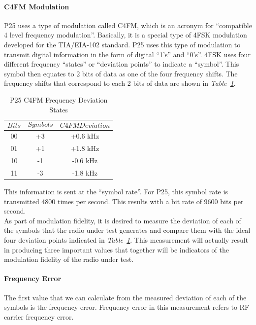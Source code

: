 \paragraph*{C4FM Modulation}  
\- \indent
	P25 uses a type of modulation called C4FM, which is an acronym for “compatible 4 level frequency modulation”\cite{fidelity}. Basically, it is a special type of 4FSK modulation developed for the TIA/EIA-102 standard. P25 uses this type of modulation to transmit digital information in the form of digital “1’s” and “0’s”. 4FSK uses four different frequency “states” or “deviation points” to indicate a “symbol”. This symbol then equates to 2 bits of data as one of the four frequency shifts. The frequency shifts that correspond to each 2 bits of data are shown in \textit{Table~\ref{tab:modfide}}.
	
\begin{table}[H]
  \centering
 	\caption{P25 C4FM Frequency Deviation States}
    \begin{tabular}{c|c|c}
       $$Bits$$ & $$Symbols$$ & $$C4FM Deviation$$ \\ \hline
       00 & +3 & +0.6 kHz  \\ \hline
       01 & +1 & +1.8 kHz  \\ \hline
       10 & -1 & -0.6 kHz  \\ \hline
       11 & -3 & -1.8 kHz  
      
  \end{tabular}
  
  \label{tab:modfide}
\end{table}

	This information is sent at the “symbol rate”. For P25, this symbol rate is transmitted 4800 times per second. This results  with a bit rate of 9600 bits per second. \\
		
	As part of modulation fidelity, it is desired to measure the deviation of each of the symbols that the radio under test generates and compare them with the ideal four deviation points indicated in \textit{Table~\ref{tab:modfide}}. This measurement will actually result in producing three important values that together will be indicators of the modulation fidelity of the radio under test.

\newpage

\paragraph*{Frequency Error} 
\- \indent
	The first value that we can calculate from the measured deviation of each of the symbols is the frequency error. Frequency error in this measurement refers to RF carrier frequency error.\\
		
